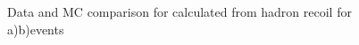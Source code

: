 \begin{figure}[!tbp]
\begin{minipage}[h]{0.49\linewidth}
\end{minipage}
\hfill
\begin{minipage}[h]{0.49\linewidth}
\end{minipage}
\caption{Data and MC comparison for \etmiss calculated from hadron recoil for a)\wenu b)\wmunu events}
\label{ris:HadrRecoilEtMiss}
\end{figure}


